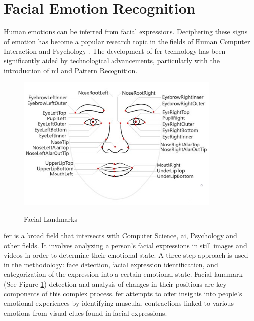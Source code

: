 \section{Facial Emotion Recognition}
Human emotions can be inferred from facial expressions. 
Deciphering these signs of emotion has become a popular research topic in the fields of Human Computer Interaction and Psychology \citep{vemou_2021_facial}.
The development of \gls{fer} technology has been significantly aided by technological advancements, particularly with the introduction of \gls{ml} and Pattern Recognition.
\begin{figure}[H]
    \centering
    \includegraphics[width=10cm]{Images/landmarks.jpg}
    \caption{Facial Landmarks} \footnotesize{\citep{patrickfarley_2023_face}}
    \label{fig:facial_landmark}
\end{figure}
\indent \gls{fer} is a broad field that intersects with Computer Science, \gls{ai}, Psychology and other fields. 
It involves analyzing a person's facial expressions in still images and videos in order to determine their emotional state. 
A three-step approach is used in the methodology: face detection, facial expression identification, and categorization of the expression into a certain emotional state. 
Facial landmark (See Figure \ref{fig:facial_landmark}) detection and analysis of changes in their positions are key components of this complex process. 
\gls{fer} attempts to offer insights into people's emotional experiences by identifying muscular contractions linked to various emotions from visual clues found in facial expressions.
